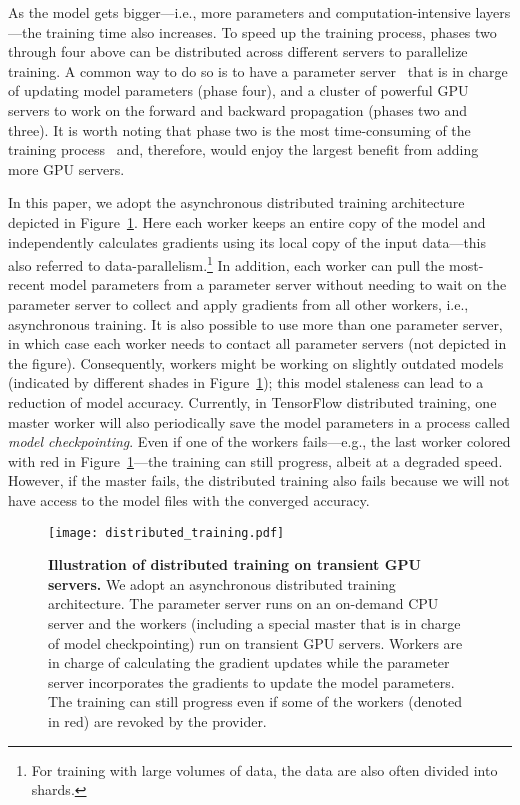 


As the model gets bigger---i.e., more parameters and computation-intensive
layers---the training time also increases.  To speed up the training process,
phases two through four above can be distributed across different servers
to parallelize training.  A common way to do so is to have a parameter
server~\cite{stale1,geeps} that is in charge of updating model parameters (phase
four), and a cluster of powerful GPU servers to work on the forward and
backward propagation (phases two and three).  It is worth noting that phase two is
the most time-consuming of the training process~\cite{efficient_dnn} and, therefore, would enjoy the
largest benefit from adding more GPU servers.

In this paper, we adopt the asynchronous distributed training architecture
depicted in Figure~\ref{bg:dist_train}. Here  each worker keeps an entire copy
of the model and independently calculates gradients using its local copy of the
input data---this also referred to data-parallelism.\footnote{For training with
large volumes of data, the data are also often divided into shards.} In
addition, each worker can pull the most-recent model parameters from a
parameter server without needing to wait on the parameter server to collect and
apply gradients from all other workers, i.e., asynchronous training. It is also
possible to use more than one parameter server, in which case each worker
needs to contact all parameter servers (not depicted in the figure).
Consequently, workers might be working on slightly outdated models (indicated
by different shades in Figure~\ref{bg:dist_train}); this model staleness can
lead to a reduction of model accuracy. Currently, in TensorFlow distributed
training, one master worker will also periodically save the model parameters in
a process called \emph{model checkpointing}.
Even if one of the workers fails---e.g., the last worker colored with red in
Figure~\ref{bg:dist_train}---the training can still progress, albeit at a
degraded speed. However, if the master fails, the distributed training
also fails because we will not have access to the model files with the
converged accuracy. 


\begin{figure}[t]
\centering
    \texttt{[image: distributed\_training.pdf]}
\caption{\textbf{Illustration of distributed training on transient GPU
  servers.} We adopt an asynchronous distributed training architecture. The
  parameter server  runs on an on-demand CPU server and the workers (including a
  special master that is in charge of model checkpointing) run on transient GPU
  servers. Workers are in charge of calculating the gradient updates while the
  parameter server incorporates the gradients to update the model parameters.
  The training can still progress even if some of the workers (denoted in red)
  are revoked by the provider.}
    \label{bg:dist_train}
\end{figure}


